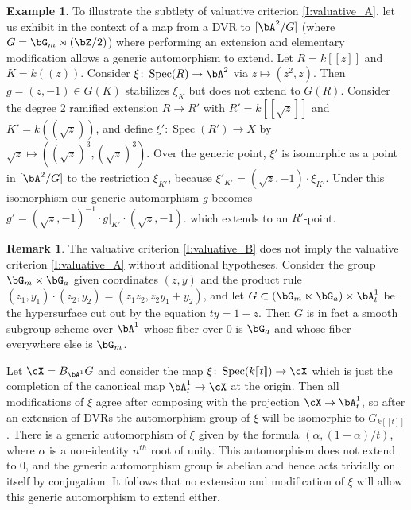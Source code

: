 \documentclass[a4paper]{amsart}
\numberwithin{equation}{section}
\theoremstyle{plain}
\theoremstyle{definition}
\newtheorem{rem}[thm]{Remark}
\newtheorem{ex}[thm]{Example}
\DeclareMathOperator{\Spec}{Spec}
\newcommand{\co}{\colon}
\begin{document}
\begin{ex} \label{E:ex2}
To illustrate the subtlety of valuative criterion \eqref{I:valuative_A}, let us exhibit in the context of  a map from a DVR to $[\bA^2 / G]$ (where $G=\bG_m \rtimes (\bZ/2)$) where performing an extension and elementary modification allows a generic automorphism to extend.   
Let $R = k[\![z]\!]$ and $K = k(\!(z)\!)$.  
Consider $\xi \co \Spec(R) \to \bA^2$ via $z \mapsto (z^2,z)$. 
Then $g=(z,-1) \in G(K)$ stabilizes $\xi_K$ but does not extend to $G(R)$.  
Consider the degree 2 ramified extension $R \to R'$ with $R'=k[\![\sqrt{z}]\!]$ and $K' = k(\!(\sqrt{z})\!)$, 
and define $\xi' \co \Spec(R') \to X$ by $\sqrt{z} \mapsto ((\sqrt{z})^3,(\sqrt{z})^3)$. 
Over the generic point, $\xi'$ is isomorphic as a point in $[\bA^2/G]$ to the restriction $\xi_{K'}$, because {$\xi'_{K'} = (\sqrt{z},-1) \cdot \xi_{K'}$.} Under this isomorphism our generic automorphism $g$ becomes 
$g' =(\sqrt{z},-1)^{-1} \cdot g|_{K'}\cdot (\sqrt{z},-1)$.
which extends to an $R'$-point. 
\end{ex}

\begin{rem}
	The valuative criterion \eqref{I:valuative_B} does not imply the valuative criterion \eqref{I:valuative_A} without additional hypotheses. Consider the group $\bG_m \ltimes \bG_a$ given coordinates $(z,y)$ and the product rule $(z_1,y_1) \cdot (z_2,y_2) = (z_1 z_2, z_2 y_1 + y_2)$, and let $G \subset (\bG_m \ltimes \bG_a) \times \bA^1_t$ be the hypersurface cut out by the equation $ty = 1-z$. Then $G$ is in fact a smooth subgroup scheme over $\bA^1$ whose fiber over $0$ is $\bG_a$ and whose fiber everywhere else is $\bG_m$.
	
	Let $\cX = B_{\bA^1}G$ and consider the map $\xi \co \Spec(k[\![t]\!]) \to \cX$ which is just the completion of the canonical map $\bA^1_t \to \cX$ at the origin. Then all modifications of $\xi$ agree after composing with the projection $\cX \to \bA^1_t$, so after an extension of DVRs the automorphism group of $\xi$ will be isomorphic to $G_{k[\![t]\!]}$. There is a generic automorphism of $\xi$ given by the formula $(\alpha,(1-\alpha) / t)$, where $\alpha$ is a non-identity $n^{th}$ root of unity. This automorphism does not extend to $0$, and the generic automorphism group is abelian and hence acts trivially on itself by conjugation. It follows that no extension and modification of $\xi$ will allow this generic automorphism to extend either.
	\end{rem}
\end{document}
